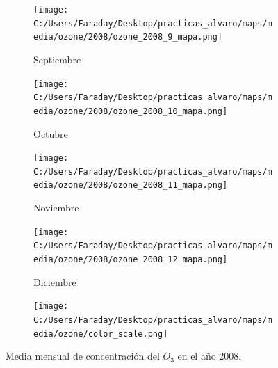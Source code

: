 \documentclass[12pt]{beamer}
\begin{document}
\begin{frame}[squeeze]
\begin{figure}[H]
\begin{subfigure}[H]{0.20\textwidth}
\texttt{[image: C:/Users/Faraday/Desktop/practicas\_alvaro/maps/media/ozone/2008/ozone\_2008\_9\_mapa.png]}
\captionsetup{labelformat=empty}
\caption{\scriptsize Septiembre}
\label{fig:map-ozone-2008-9}
\end{subfigure}
%
\begin{subfigure}[H]{0.20\textwidth}
\texttt{[image: C:/Users/Faraday/Desktop/practicas\_alvaro/maps/media/ozone/2008/ozone\_2008\_10\_mapa.png]}
\captionsetup{labelformat=empty}
\caption{\scriptsize Octubre}
\label{fig:map-ozone-2008-10}
\end{subfigure}
%
\begin{subfigure}[H]{0.20\textwidth}
\texttt{[image: C:/Users/Faraday/Desktop/practicas\_alvaro/maps/media/ozone/2008/ozone\_2008\_11\_mapa.png]}
\captionsetup{labelformat=empty}
\caption{\scriptsize Noviembre}
\label{fig:map-ozone-2008-11}
\end{subfigure}
%
\begin{subfigure}[H]{0.20\textwidth}
\texttt{[image: C:/Users/Faraday/Desktop/practicas\_alvaro/maps/media/ozone/2008/ozone\_2008\_12\_mapa.png]}
\captionsetup{labelformat=empty}
\caption{\scriptsize Diciembre}
\label{fig:map-ozone-2008-12}
\end{subfigure}

\begin{subfigure}[H]{0.45\textwidth}
\texttt{[image: C:/Users/Faraday/Desktop/practicas\_alvaro/maps/media/ozone/color\_scale.png]}
\captionsetup{labelformat=empty}
\caption{}
\end{subfigure}

\vspace*{-7mm}
\caption{\scriptsize Media mensual de concentración del $O_{3}$ en el año 2008.}
\label{fig:map-ozone-2008}
\end{figure}
\end{frame}
\end{document}
